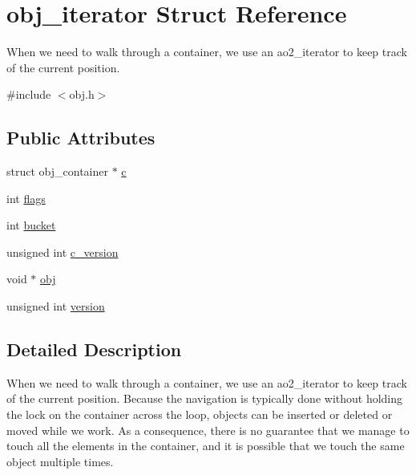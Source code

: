 \hypertarget{structobj__iterator}{
\section{obj\_\-iterator Struct Reference}
\label{structobj__iterator}
}


When we need to walk through a container, we use an ao2\_\-iterator to keep track of the current position.  




{\ttfamily \#include $<$obj.h$>$}

\subsection*{Public Attributes}
\begin{DoxyCompactItemize}
\item 
struct obj\_\-container $\ast$ \hyperlink{structobj__iterator_a5ecf21f7dd1f55e01db059a59c9d0d85}{c}
\item 
int \hyperlink{structobj__iterator_a09adf4a77131fe2d9a4a295cd694500a}{flags}
\item 
int \hyperlink{structobj__iterator_a5c2c1cc03d280d34568eb6abade757bb}{bucket}
\item 
unsigned int \hyperlink{structobj__iterator_afb5ef4e84bc1785aa3948f502bae545c}{c\_\-version}
\item 
void $\ast$ \hyperlink{structobj__iterator_aa50a51c930aa20abd91194f03f0265b3}{obj}
\item 
unsigned int \hyperlink{structobj__iterator_a1051579d4ab6b9e35195160229ef9fd6}{version}
\end{DoxyCompactItemize}


\subsection{Detailed Description}
When we need to walk through a container, we use an ao2\_\-iterator to keep track of the current position. Because the navigation is typically done without holding the lock on the container across the loop, objects can be inserted or deleted or moved while we work. As a consequence, there is no guarantee that we manage to touch all the elements in the container, and it is possible that we touch the same object multiple times.

